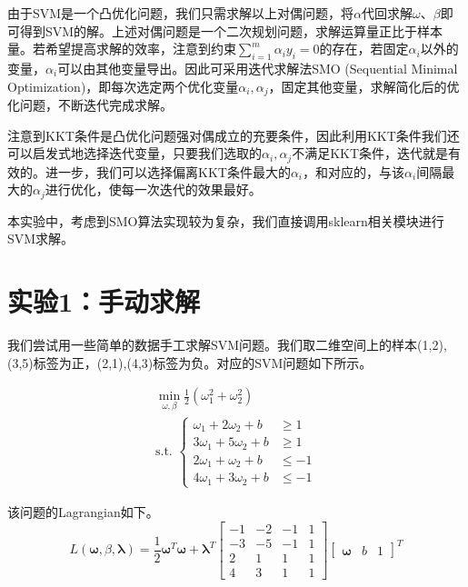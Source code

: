 \documentclass[11pt]{article}
\begin{document}
由于SVM是一个凸优化问题，我们只需求解以上对偶问题，将\(\alpha\)代回求解\(\omega\)、\(\beta\)即可得到SVM的解。上述对偶问题是一个二次规划问题，求解运算量正比于样本量。若希望提高求解的效率，注意到约束\(\sum_{i=1}^{m} \alpha_{i} y_{i}=0\)的存在，若固定\(\alpha_i\)以外的变量，\(\alpha_i\)可以由其他变量导出。因此可采用迭代求解法SMO (Sequential Minimal Optimization)，即每次选定两个优化变量\(\alpha_i,\alpha_j\)，固定其他变量，求解简化后的优化问题，不断迭代完成求解。

注意到KKT条件是凸优化问题强对偶成立的充要条件，因此利用KKT条件我们还可以启发式地选择迭代变量，只要我们选取的\(\alpha_i,\alpha_j\)不满足KKT条件，迭代就是有效的。进一步，我们可以选择偏离KKT条件最大的\(\alpha_i\)，和对应的，与该\(\alpha_i\)间隔最大的\(\alpha_j\)进行优化，使每一次迭代的效果最好。

本实验中，考虑到SMO算法实现较为复杂，我们直接调用sklearn相关模块进行SVM求解。

    \section{实验1：手动求解}\label{ux5b9eux9a8c1ux624bux52a8ux6c42ux89e3}

我们尝试用一些简单的数据手工求解SVM问题。我们取二维空间上的样本(1,2),(3,5)标签为正，(2,1),(4,3)标签为负。对应的SVM问题如下所示。

\[
\begin{array}{l}
\min_{\omega,\beta} \frac{1}{2} (\omega_1^{2} + \omega_2^{2}) \\
\text{s.t. } \left\{\begin{array}{rl}
\omega_1 + 2\omega_2 + b &\ge 1 \\
3\omega_1 + 5\omega_2 + b &\ge 1 \\
2\omega_1 + \omega_2 +b &\le -1 \\
4\omega_1 + 3\omega_2 +b &\le -1
\end{array}
\right.
\end{array}
\]

该问题的Lagrangian如下。
\[L(\boldsymbol{\omega},\beta,\boldsymbol{\lambda}) = \frac{1}{2} \boldsymbol{\omega}^{T} \boldsymbol{\omega} + \boldsymbol{\lambda}^{T} \left[\begin{array}{cccc}
-1 & -2 & -1 & 1 \\
-3 & -5 & -1 & 1 \\
2 & 1 & 1 & 1 \\
4 & 3 & 1 & 1 \end{array} \right] \left[\begin{array}{ccc} \boldsymbol{\omega} & b & 1 \end{array}\right]^{T} \]
\end{document}
